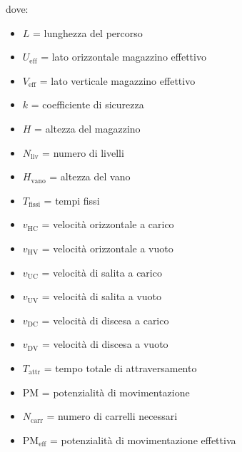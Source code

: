 \documentclass[11pt]{article}
\begin{document}
dove:
\begin{itemize}
    \item $L$ = lunghezza del percorso
    \item $U_\text{eff}$ = lato orizzontale magazzino effettivo
    \item $V_\text{eff}$ = lato verticale magazzino effettivo
    \item $k$ = coefficiente di sicurezza
    \item $H$ = altezza del magazzino
    \item $N_\text{liv}$ = numero di livelli
    \item $H_\text{vano}$ = altezza del vano
    \item $T_\text{fissi}$ = tempi fissi
    \item $v_\text{HC}$ = velocità orizzontale a carico
    \item $v_\text{HV}$ = velocità orizzontale a vuoto
    \item $v_\text{UC}$ = velocità di salita a carico
    \item $v_\text{UV}$ = velocità di salita a vuoto
    \item $v_\text{DC}$ = velocità di discesa a carico
    \item $v_\text{DV}$ = velocità di discesa a vuoto
    \item $T_\text{attr}$ = tempo totale di attraversamento
    \item $\text{PM}$ = potenzialità di movimentazione
    \item $N_\text{carr}$ = numero di carrelli necessari
    \item $\text{PM}_\text{eff}$ = potenzialità di movimentazione effettiva
\end{itemize}
\newpage
\end{document}
